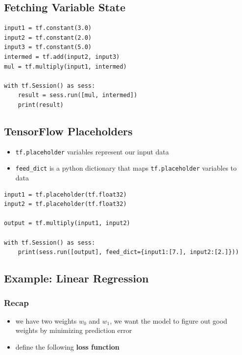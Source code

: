 \documentclass[11pt]{article}
\begin{document}
\subsection*{Fetching Variable State}
\label{sec:org25332dc}

\begin{verbatim}
input1 = tf.constant(3.0)
input2 = tf.constant(2.0)
input3 = tf.constant(5.0)
intermed = tf.add(input2, input3)
mul = tf.multiply(input1, intermed)

with tf.Session() as sess:
    result = sess.run([mul, intermed])
    print(result)
\end{verbatim}

\subsection*{TensorFlow Placeholders}
\label{sec:org4ff502b}

\begin{itemize}
\item \texttt{tf.placeholder} variables represent our input data
\item \texttt{feed\_dict} is a python dictionary that maps \texttt{tf.placeholder} variables to data
\end{itemize}

\begin{verbatim}
input1 = tf.placeholder(tf.float32)
input2 = tf.placeholder(tf.float32)

output = tf.multiply(input1, input2)

with tf.Session() as sess:
    print(sess.run([output], feed_dict={input1:[7.], input2:[2.]}))
\end{verbatim}

\subsection*{Example: Linear Regression}
\label{sec:orgb030c72}
\subsubsection*{Recap}
\label{sec:orged185f8}
\begin{itemize}
\item we have two weights \(w_0\) and \(w_1\), we want the model to figure out good weights by minimizing prediction error
\item define the following \textbf{loss function}
\end{itemize}
\end{document}
